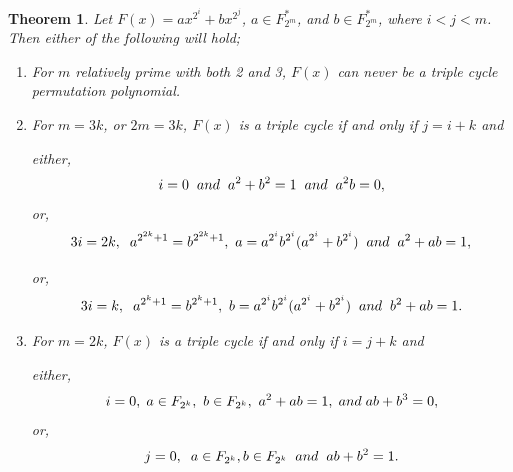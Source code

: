 \documentclass[12pt,a4paper]{article}
\newtheorem{theorem}{Theorem}[section]
\begin{document}
\begin{theorem}\label{t5}
	Let $ F(x)=ax^{2^{i}}+bx^{2^{j}} $, $ a\in F_{2^{m}}^{*} $, and $ b\in F_{2^{m}}^{*} $, where $ i<j<m $. Then either of the following will hold;
	\begin{enumerate}
		\item For $ m $ relatively prime with both 2 and 3, $ F(x) $ can never be a triple cycle permutation polynomial.
		\item For $ m=3k $, or $ 2m=3k $, $ F(x) $ is a triple cycle if and only if $ j=i+k $ and
		
		either,
		\begin{equation}
			i=0\hspace{.2cm} and \hspace{.2cm}  a^{2}+b^{2}=1 \hspace{.2cm} and \hspace{.2cm} a^{2}b=0,  
		\end{equation}
		or, 
		\begin{equation}
			3i=2k,\hspace{.2cm}  a^{2^{2k}+1}=b^{2^{2k}+1},  ~a=a^{2^{i}}b^{2^{i}}(a^{2^{i}}+b^{2^{i}}) \hspace{.2cm} and\hspace{.2cm}  a^{2}+ab=1,
		\end{equation}
		
		or, 
		\begin{equation}
			3i=k,\hspace{.2cm}  a^{2^{k}+1}=b^{2^{k}+1}, ~ b=a^{2^{i}}b^{2^{i}}(a^{2^{i}}+b^{2^{i}}) \hspace{.2cm} and\hspace{.2cm}  b^{2}+ab=1. 
		\end{equation}
		\item For $ m=2k $, $ F(x) $ is a triple cycle if and only if $ i=j+k $ and 
		
		either,
		\begin{equation}
			i=0,\hspace{0.1cm}  a\in F_{2^{k}}, ~ b\in F_{2^{k}}, ~a^{2}+ab=1,\hspace{0.1cm} and\hspace{0.1cm}  ab+b^{3}=0,
		\end{equation}
		or,
		\begin{equation}
			j=0,\hspace{.2cm}  a\in F_{2^{k}} , b\in F_{2^{k}} \hspace{.2cm} and\hspace{.2cm}  ab+b^{2}=1.
		\end{equation}
	\end{enumerate}
\end{theorem}
\end{document}
